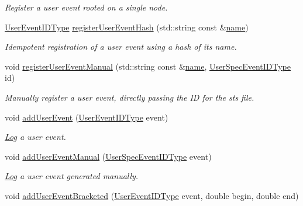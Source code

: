 \begin{DoxyCompactItemize}
\begin{DoxyCompactList}\small\item\em Register a user event rooted on a single node. \end{DoxyCompactList}\item 
\hyperlink{namespacevt_1_1trace_a5908920d051c144c89f17c69ed262350}{User\+Event\+I\+D\+Type} \hyperlink{structvt_1_1trace_1_1_trace_a1b80a8ca6bebbfbe61f8b119342e14f7}{register\+User\+Event\+Hash} (std\+::string const \&\hyperlink{structvt_1_1trace_1_1_trace_aaae4bbf6d009229a5c8b9db67a127942}{name})
\begin{DoxyCompactList}\small\item\em Idempotent registration of a user event using a hash of its name. \end{DoxyCompactList}\item 
void \hyperlink{structvt_1_1trace_1_1_trace_ade8d39718f60924f1aeb178ccda56cbc}{register\+User\+Event\+Manual} (std\+::string const \&\hyperlink{structvt_1_1trace_1_1_trace_aaae4bbf6d009229a5c8b9db67a127942}{name}, \hyperlink{namespacevt_1_1trace_a70c43e0e1596eea236912d4197d3120a}{User\+Spec\+Event\+I\+D\+Type} id)
\begin{DoxyCompactList}\small\item\em Manually register a user event, directly passing the ID for the sts file. \end{DoxyCompactList}\item 
void \hyperlink{structvt_1_1trace_1_1_trace_a0a4bbdf7bd3c2b8742cbceb24389a4c0}{add\+User\+Event} (\hyperlink{namespacevt_1_1trace_a5908920d051c144c89f17c69ed262350}{User\+Event\+I\+D\+Type} event)
\begin{DoxyCompactList}\small\item\em \hyperlink{structvt_1_1trace_1_1_log}{Log} a user event. \end{DoxyCompactList}\item 
void \hyperlink{structvt_1_1trace_1_1_trace_a2d9fac6bd71ba67e4f87b7efd7c6c6c7}{add\+User\+Event\+Manual} (\hyperlink{namespacevt_1_1trace_a70c43e0e1596eea236912d4197d3120a}{User\+Spec\+Event\+I\+D\+Type} event)
\begin{DoxyCompactList}\small\item\em \hyperlink{structvt_1_1trace_1_1_log}{Log} a user event generated manually. \end{DoxyCompactList}\item 
void \hyperlink{structvt_1_1trace_1_1_trace_ae57a7ff5517a5bc0694677f10810b545}{add\+User\+Event\+Bracketed} (\hyperlink{namespacevt_1_1trace_a5908920d051c144c89f17c69ed262350}{User\+Event\+I\+D\+Type} event, double begin, double end)

\end{DoxyCompactItemize}
